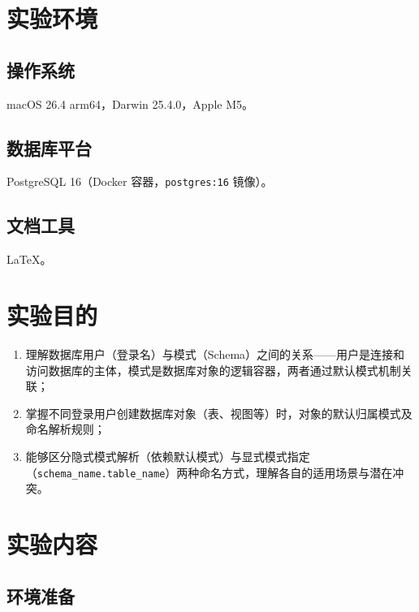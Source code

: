 \documentclass[12pt, a4paper]{academics}
\begin{document}
\def\PYGZus{\textunderscore}

\makeacademicscover

\section{实验环境}

\subsection{操作系统}

macOS 26.4 arm64，Darwin 25.4.0，Apple M5。

\subsection{数据库平台}

PostgreSQL 16（Docker 容器，\texttt{postgres:16} 镜像）。

\subsection{文档工具}

\LaTeX{}。

\section{实验目的}

\begin{enumerate}
    \item 理解数据库用户（登录名）与模式（Schema）之间的关系——用户是连接和访问数据库的主体，模式是数据库对象的逻辑容器，两者通过默认模式机制关联；
    \item 掌握不同登录用户创建数据库对象（表、视图等）时，对象的默认归属模式及命名解析规则；
    \item 能够区分隐式模式解析（依赖默认模式）与显式模式指定（\texttt{schema\_name.table\_name}）两种命名方式，理解各自的适用场景与潜在冲突。
\end{enumerate}

\section{实验内容}

\subsection{环境准备}
\end{document}
